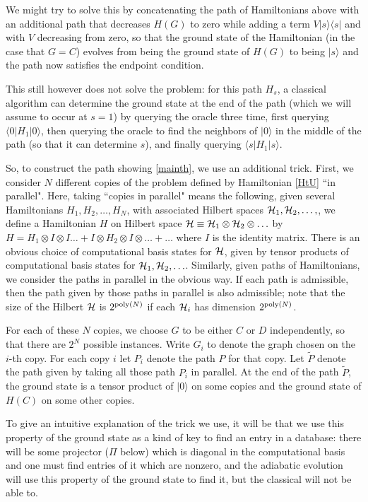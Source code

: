 \documentclass[letterpaper,onecolumn]{quantumarticle}
\newcommand{\poly}{{\rm poly}}
\newcommand{\cH}{{\cal H}}
\begin{document}
We might try to solve this by concatenating the path of Hamiltonians above with an additional path that decreases $H(G)$ to zero while adding a term $V |s\rangle\langle s|$ and with $V$ decreasing from zero, so that the ground state of the Hamiltonian (in the case that $G=C$) evolves from being the ground state of $H(G)$ to being $|s\rangle$ and the path now satisfies the endpoint condition.

This still however does not solve the problem: for this path $H_s$, a classical algorithm can determine the ground state at the end of the path (which we will assume to occur at $s=1$) by querying the oracle three time, first querying $\langle 0 | H_1 | 0\rangle$, then querying the oracle to find the neighbors of $|0\rangle$ in the middle of the path (so that it can determine $s$), and
finally querying $\langle s | H_1 | s \rangle$.

So, to construct the path showing  \cref{mainth}, we use an additional trick.
First, we consider $N$ different copies of the problem defined by Hamiltonian \cref{HtU} ``in parallel".  Here, taking ``copies in parallel" means the following, given several Hamiltonians $H_1,H_2,\ldots,H_N$, with associated Hilbert spaces $\cH_1,\cH_2,\ldots,$, we define a Hamiltonian $H$ on Hilbert space $\cH\equiv \cH_1 \otimes \cH_2 \otimes \ldots$ by
$H=H_1\otimes I \otimes I \ldots+ I\otimes H_2 \otimes I \otimes \ldots + \ldots$ where $I$ is the identity matrix.
There is an obvious choice of computational basis states for $\cH$, given by tensor products of computational basis states for $\cH_1,\cH_2,\ldots$.
Similarly, given paths of Hamiltonians, we consider the paths in parallel in the obvious way.
If each path is admissible, then the path given by those paths in parallel is also admissible; note that the size of the Hilbert $\cH$ is $2^{\poly(N)}$ if each $\cH_i$ has dimension $2^{\poly(N)}$.


For each of these $N$ copies, we choose $G$ to be either $C$ or $D$ independently, so that there are $2^N$ possible instances.
Write $G_i$ to denote the graph chosen on the $i$-th copy.
For each copy $i$ let $P_i$ denote the path $P$ for that copy.  Let $\tilde P$ denote the path given by taking all those path $P_i$ in parallel.  At the end of the path $\tilde P$, the ground state is a tensor product of $|0\rangle$ on some copies and the ground state of $H(C)$ on some other copies.

To give an intuitive explanation of the trick we use, it will be that we use this property of the ground state as a kind of key to find an entry in a database: there will be some projector ($\Pi$ below) which is diagonal in the computational basis and one must find entries of it which are nonzero, and the adiabatic evolution will use this property of the ground state to find it, but the classical will not be able to.
\end{document}
